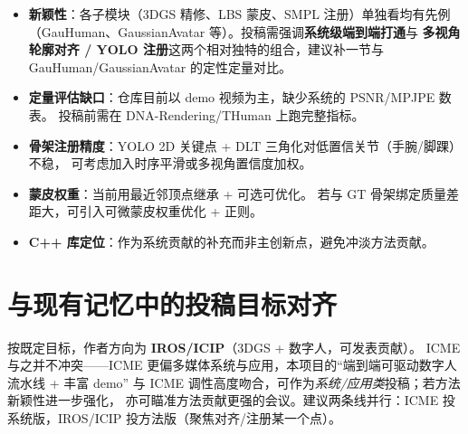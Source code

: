 \documentclass[11pt]{article}
\begin{document}
\begin{itemize}[leftmargin=1.4em]
  \item \textbf{新颖性}：各子模块（3DGS 精修、LBS 蒙皮、SMPL 注册）单独看均有先例
        （GauHuman、GaussianAvatar 等）。投稿需强调\textbf{系统级端到端打通}与
        \textbf{多视角轮廓对齐 / YOLO 注册}这两个相对独特的组合，建议补一节与
        GauHuman/GaussianAvatar 的定性定量对比。
  \item \textbf{定量评估缺口}：仓库目前以 demo 视频为主，缺少系统的 PSNR/MPJPE 数表。
        投稿前需在 DNA-Rendering/THuman 上跑完整指标。
  \item \textbf{骨架注册精度}：YOLO 2D 关键点 + DLT 三角化对低置信关节（手腕/脚踝）不稳，
        可考虑加入时序平滑或多视角置信度加权。
  \item \textbf{蒙皮权重}：当前用最近邻顶点继承 + 可选可优化。
        若与 GT 骨架绑定质量差距大，可引入可微蒙皮权重优化 + 正则。
  \item \textbf{C++ 库定位}：作为系统贡献的补充而非主创新点，避免冲淡方法贡献。
\end{itemize}

\section{与现有记忆中的投稿目标对齐}

按既定目标，作者方向为 \textbf{IROS/ICIP}（3DGS + 数字人，可发表贡献）。
ICME 与之并不冲突——ICME 更偏多媒体系统与应用，本项目的``端到端可驱动数字人流水线 + 丰富 demo''
与 ICME 调性高度吻合，可作为\emph{系统/应用类}投稿；若方法新颖性进一步强化，
亦可瞄准方法贡献更强的会议。建议两条线并行：ICME 投系统版，IROS/ICIP 投方法版（聚焦对齐/注册某一个点）。
\end{document}

